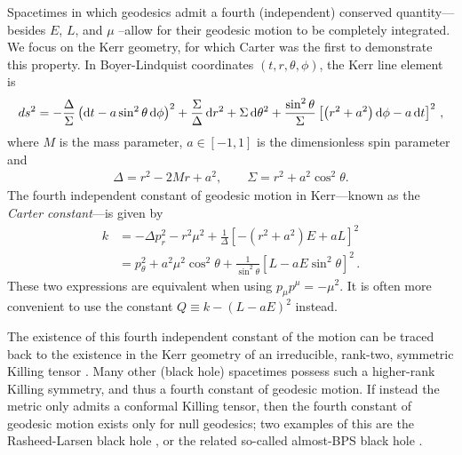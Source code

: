 \documentclass[graybox,envcountchap]{svmult}
\newcommand{\ed}{\mathop{}\!\mathrm{d}}
\newcommand{\br}[1]{\left[#1\right]}
\newcommand{\pa}[1]{\left(#1\right)}
\begin{document}
Spacetimes in which geodesics admit a fourth (independent) conserved quantity---besides $E$, $L$, and $\mu$ --allow for their geodesic motion to be completely integrated.
We focus on the Kerr geometry, for which Carter \cite{Carter1968} was the first to demonstrate this property.
In Boyer-Lindquist coordinates $(t,r,\theta,\phi)$, the Kerr line element is
\begin{gather}
    ds^2=-\frac{\Delta}{\Sigma}\pa{\ed t-a\sin^2{\theta}\ed\phi}^2+\frac{\Sigma}{\Delta}\ed r^2+\Sigma\ed\theta^2+\frac{\sin^2{\theta}}{\Sigma}\br{\pa{r^2+a^2}\ed\phi-a\ed t}^2\,,\notag
\end{gather}
where $M$ is the mass parameter, $a \in [-1,1]$ is the dimensionless spin parameter and
\begin{gather}
    \Delta=r^2-2Mr+a^2,\qquad
    \Sigma=r^2+a^2\cos^2{\theta}.
\end{gather}
The fourth independent constant of geodesic motion in Kerr---known as the \emph{Carter constant}---is given by \cite{Carter1968}
\begin{align}
    k&=-\Delta p_r^2-r^2\mu^2+\frac{1}{\Delta}\br{-\pa{r^2+a^2}E+aL}^2\\
    &=p_\theta^2+a^2\mu^2\cos^2{\theta}+\frac{1}{\sin^2{\theta}}\br{L-aE\sin^2{\theta}}^2\,.
\end{align}
These two expressions are equivalent when using $p_\mu p^\mu=-\mu^2$.
It is often more convenient to use the constant $Q\equiv k-(L-aE)^2$ instead.

The existence of this fourth independent constant of the motion can be traced back to the existence in the Kerr geometry of an irreducible, rank-two, symmetric Killing tensor \cite{Walker1970}.
Many other (black hole) spacetimes possess such a higher-rank Killing symmetry, and thus a fourth constant of geodesic motion.
If instead the metric only admits a conformal Killing tensor, then the fourth constant of geodesic motion exists only for null geodesics; two examples of this are the Rasheed-Larsen black hole \cite{Rasheed1995,Larsen2000,Keeler2012}, or the related so-called almost-BPS black hole \cite{Bah2021,Staelens2022}.
\end{document}
